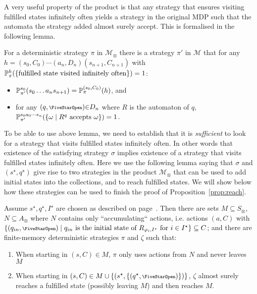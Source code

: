 \documentclass[a4paper,UKenglish]{lipics}
\newcommand{\symbopen}{\text{\scriptsize\FiveStarOpen}}
\newcommand{\mdp}{\mathcal{M}}
\renewcommand{\Pr}[3][]{\ifblank{#1}{\mathbb{P}_{#2}}{\mathbb{P}^{#1}_{#2}}(#3)}
\newcommand{\rabin}{R}
\newcommand{\fix}[1]{{#1^\star}}
\newcommand{\fixs}{\fix{s}}
\newcommand{\fixq}{\fix{q}}
\newcommand{\fixI}{\fix{I}}
\begin{document}
A very useful property of the product is that any strategy that ensures visiting fulfilled states infinitely often yields a strategy in the original MDP such that the automata the strategy added almost surely accept. This is formalised in the following lemma.

\begin{lemma}\label{lemma:prod-to-orig}
	For a deterministic strategy $\pi$ in $\mdp_\otimes$ there is a strategy $\pi'$ in $\mdp$ that for any $h = (s_0,C_0) \cdots (a_n,D_n)(s_{n+1},C_{n+1})$ with
	$\Pr[h]{\pi}{\{\text{fulfilled state visited infinitely often}  \}} = 1$:
	\begin{itemize}
		\item $\Pr[s_0]{\pi'}{s_0\ldots a_n s_{n+1}} =\Pr[(s_0,C_0)]{\pi}{h}$, and 
		\item for any $(q,\symbopen) {\in} D_n$ where $R$ is the automaton of $q$, 
		$\Pr[s_0 a_0 \cdots s_n]{\pi'}{\{\omega \mid \text{$\rabin^q$ accepts $\omega$}\}} = 1$.
	\end{itemize}
\end{lemma}

To be able to use above lemma, we need to establish that it is {\em sufficient} to look for a strategy that visits fulfilled states infinitely often. In other words that existence of the satisfying strategy $\sigma$ implies existence of a strategy that visits fulfilled states infinitely often.
Here we use the following lemma saying that $\sigma$ and $(\fixs,\fixq)$ give rise to two
strategies in the product $\mdp_\otimes$ that can be used to add initial states into the collections, and to
reach fulfilled states. We will show below how these strategies can be used to finish the proof of Proposition~\ref{prop:reach}.

\begin{lemma}\label{prop:screwing-paths}
Assume $\fixs, \fixq, \fixI$ are chosen as described on page~\pageref{page:sqI}.	
	Then there are sets $M \subseteq S_\otimes$, $N\subseteq A_\otimes$ where 
	$N$ contains only ``accumulating`` actions, i.e. actions $(a,C)$ with $\{(q_{in}, \symbopen) \mid q_{in} \text{ is the initial state of $\rabin_{\varphi_i,\fixI}$ for } i \in \fixI\} \subseteq C$;
	and there are finite-memory deterministic strategies $\pi$ and $\zeta$ such that:
	\begin{enumerate} 
		\item\label{item:screwing-a}
		When starting in $(s,C) \in M$, $\pi$ only uses actions from $N$ and never leaves $M$
		\item\label{item:screwing-c} When starting in $(s,C) \in M\cup\{(\fixs,\{(\fixq,\symbopen)\})\}$,  $\zeta$ almost surely reaches a fulfilled state (possibly leaving $M$) and then reaches $M$.
	\end{enumerate}
\end{lemma}
\end{document}
